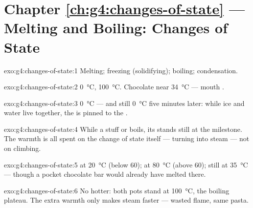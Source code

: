 \section*{Chapter \ref{ch:g4:changes-of-state} --- Melting and Boiling: Changes of State}

\begin{solution}{exo:g4:changes-of-state:1}
Melting; freezing (solidifying); boiling; condensation.
\end{solution}

\begin{solution}{exo:g4:changes-of-state:2}
 \qty{0}{\celsius},  \qty{100}{\celsius}.
Chocolate  near \qty{34}{\celsius} --- mouth .
\end{solution}

\begin{solution}{exo:g4:changes-of-state:3}
\qty{0}{\celsius} --- and still \qty{0}{\celsius} five minutes
later: while ice and water live together, the  is pinned
to the .
\end{solution}

\begin{solution}{exo:g4:changes-of-state:4}
While a stuff  or boils, its  stands still at the
milestone. The warmth is all spent on the change of state itself ---
turning  into steam --- not on climbing.
\end{solution}

\begin{solution}{exo:g4:changes-of-state:5}
 at \qty{20}{\celsius} (below $60$);  at
\qty{80}{\celsius} (above $60$); still  at \qty{35}{\celsius}
--- though a pocket chocolate bar would already have melted there.
\end{solution}

\begin{solution}{exo:g4:changes-of-state:6}
No hotter: both pots stand at \qty{100}{\celsius}, the boiling
plateau. The extra warmth only makes steam faster --- wasted flame,
same pasta.
\end{solution}

